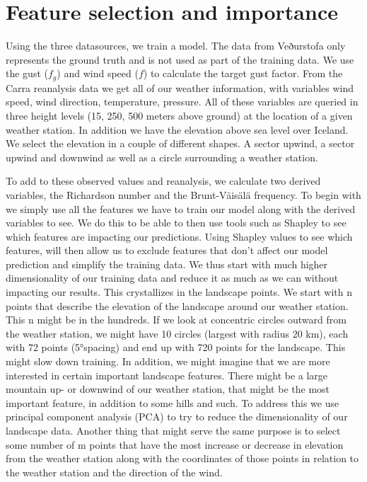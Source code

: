 \section{Feature selection and importance}
Using the three datasources, we train a model. The data from Veðurstofa only represents the ground truth and is not used as part of the training data. We use the gust ($f_g$) and wind speed ($f$) to calculate the target gust factor. From the Carra reanalysis data we get all of our weather information, with variables wind speed, wind direction, temperature, pressure. All of these variables are queried in three height levels (15, 250, 500 meters above ground) at the location of a given weather station. In addition we have the elevation above sea level over Iceland. We select the elevation in a couple of different shapes. A sector upwind, a sector upwind and downwind as well as a circle surrounding a weather station.

To add to these observed values and reanalysis, we calculate two derived variables, the Richardson number and the Brunt-Väisälä frequency. To begin with we simply use all the features we have to train our model along with the derived variables to see. We do this to be able to then use tools such as Shapley to see which features are impacting our predictions. Using Shapley values to see which features, will then allow us to exclude features that don't affect our model prediction and simplify the training data. We thus start with much higher dimensionality of our training data and reduce it as much as we can without impacting our results. This crystallizes in the landscape points. We start with n points that describe the elevation of the landscape around our weather station. This n might be in the hundreds. If we look at concentric circles outward from the weather station, we might have 10 circles (largest with radius 20 km), each with 72 points (5°spacing) and end up with 720 points for the landscape. This might slow down training. In addition, we might imagine that we are more interested in certain important landscape features. There might be a large mountain up- or downwind of our weather station, that might be the most important feature, in addition to some hills and such. To address this we use principal component analysis (PCA) to try to reduce the dimensionality of our landscape data. Another thing that might serve the same purpose is to select some number of m points that have the most increase or decrease in elevation from the weather station along with the coordinates of those points in relation to the weather station and the direction of the wind.

